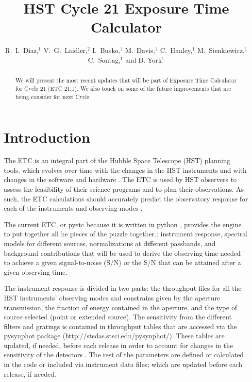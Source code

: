 
\resetcounters




\title{HST Cycle 21 Exposure Time Calculator}
\author{R.~I.~Diaz,$^1$ V.~G.~Laidler,$^2$ I.~Busko,$^1$ M.~Davis,$^1$ C.~Hanley,$^1$ M.~Sienkiewicz,$^1$ C.~Sontag,$^1$ and B. York$^1$
}


\begin{abstract}
We will present the most recent updates that will be part of Exposure Time Calculator for 
Cycle 21 (ETC 21.1). We also touch on 
some of the future improvements that are being consider for next Cycle. 
\end{abstract}

\section{Introduction}
The ETC is an integral part of the  Hubble Space Telescope (HST) planning tools, which
evolves over time with the changes in the HST
instruments and with changes in the software and hardware \citep{Diaz3_2010, Diazetal_2010}.
The ETC is used by HST observers
to assess the feasibility of their science programs and to plan their observations.
As such, the ETC calculations should accurately predict the observatory response
for each of the instruments and observing modes \citep{Diaz_2012}.

The current ETC, or pyetc because it is written in python \citep{pyetc2010}, provides the engine to
put together all he pieces of the puzzle together.: instrument response, spectral models for different
sources, normalizations at different passbands, and background contributions that will be used to derive
the observing time needed to achieve a given signal-to-noise (S/N) or the S/N that can be attained after
a given observing time.

The instrument response is divided in two parts: the throughput files for all the HST instruments'
observing modes  and constrains given by  the aperture
transmission, the  fraction of energy contained in the aperture, and the type of source selected (point or extended source).
The sensitivity from the different filters and gratings is contained in throughput tables
that are accessed via the pysynphot package (http://stsdas.stsci.edu/pysynphot/). These tables are updated, if needed,
before each release in order to account for changes in the sensitivity of the detectors \citep{cdbs_2012}.
The rest of the parameters are defined or calculated in the code or included via instrument data files;
which are updated before each release, if needed.

